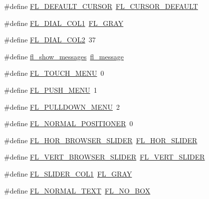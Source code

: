 \begin{DoxyCompactItemize}
$$\item 
\#define \hyperlink{forms_8_h_af97ab8836eebf7b891bc66eb3f12eb4b}{F\+L\+\_\+\+D\+E\+F\+A\+U\+L\+T\+\_\+\+C\+U\+R\+S\+OR}~\hyperlink{_enumerations_8_h_a72bde974edc7926b1217dd51b8c7e8e0a045f091aae5108f94e912bf5163344dd}{F\+L\+\_\+\+C\+U\+R\+S\+O\+R\+\_\+\+D\+E\+F\+A\+U\+LT}
\item 
\#define \hyperlink{forms_8_h_a00522f04795f199e457a85652758df15}{F\+L\+\_\+\+D\+I\+A\+L\+\_\+\+C\+O\+L1}~\hyperlink{_enumerations_8_h_aabb3b3628ea5baa2ba176201ed5d2aba}{F\+L\+\_\+\+G\+R\+AY}
\item 
\#define \hyperlink{forms_8_h_a518a6795507593a21e7df7456977c62e}{F\+L\+\_\+\+D\+I\+A\+L\+\_\+\+C\+O\+L2}~37
\item 
\#define \hyperlink{forms_8_h_a6ebdf27f23ec48234ba3c65a8bfe7fda}{fl\+\_\+show\+\_\+messages}~\hyperlink{fl__ask_8_h_a39c7e2361ffcf61722c22aadbf2b96ab}{fl\+\_\+message}
\item 
\#define \hyperlink{forms_8_h_a96827aeb9623818643d0535e831b388b}{F\+L\+\_\+\+T\+O\+U\+C\+H\+\_\+\+M\+E\+NU}~0
\item 
\#define \hyperlink{forms_8_h_a698f727d1ac36bb3fb56d8d9595bb115}{F\+L\+\_\+\+P\+U\+S\+H\+\_\+\+M\+E\+NU}~1
\item 
\#define \hyperlink{forms_8_h_ad558e3a2807505aa795961448740e55b}{F\+L\+\_\+\+P\+U\+L\+L\+D\+O\+W\+N\+\_\+\+M\+E\+NU}~2
\item 
\#define \hyperlink{forms_8_h_a5f0242fd6782834365f9713b40188f68}{F\+L\+\_\+\+N\+O\+R\+M\+A\+L\+\_\+\+P\+O\+S\+I\+T\+I\+O\+N\+ER}~0
\item 
\#define \hyperlink{forms_8_h_ac643a0236c37715e6c4161d4858fa7ba}{F\+L\+\_\+\+H\+O\+R\+\_\+\+B\+R\+O\+W\+S\+E\+R\+\_\+\+S\+L\+I\+D\+ER}~\hyperlink{_fl___slider_8_h_a15e20c6f3ef5788814779f64e37b85e5}{F\+L\+\_\+\+H\+O\+R\+\_\+\+S\+L\+I\+D\+ER}
\item 
\#define \hyperlink{forms_8_h_a8a1515032e88cb6d5763368d1118d643}{F\+L\+\_\+\+V\+E\+R\+T\+\_\+\+B\+R\+O\+W\+S\+E\+R\+\_\+\+S\+L\+I\+D\+ER}~\hyperlink{_fl___slider_8_h_ac952c3d52e860f41a4bf647ca526e64d}{F\+L\+\_\+\+V\+E\+R\+T\+\_\+\+S\+L\+I\+D\+ER}
\item 
\#define \hyperlink{forms_8_h_ac8467af514428c4316c17161c854353a}{F\+L\+\_\+\+S\+L\+I\+D\+E\+R\+\_\+\+C\+O\+L1}~\hyperlink{_enumerations_8_h_aabb3b3628ea5baa2ba176201ed5d2aba}{F\+L\+\_\+\+G\+R\+AY}
\item 
\#define \hyperlink{forms_8_h_a61ccd2c9809cbb032ca5a2907a8c3cbd}{F\+L\+\_\+\+N\+O\+R\+M\+A\+L\+\_\+\+T\+E\+XT}~\hyperlink{_enumerations_8_h_ae48bf9070f8541de17829f54ccacc6bca48e3b4ff6e390359376e79a8a6bc05c1}{F\+L\+\_\+\+N\+O\+\_\+\+B\+OX}
\end{DoxyCompactItemize}
